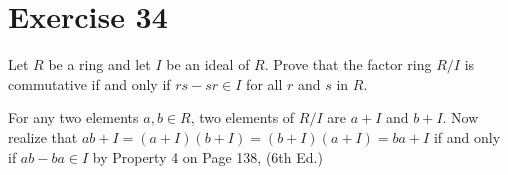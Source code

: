 \documentclass[12pt]{article}
\begin{document}
\section*{Exercise 34}

Let $R$ be a ring and let $I$ be an ideal of $R$.  Prove that the
factor ring $R/I$ is commutative if and only if $rs-sr\in I$ for all $r$ and $s$ in $R$.

For any two elements $a,b\in R$, two elements of $R/I$ are $a+I$ and $b+I$.
Now realize that $ab+I=(a+I)(b+I)=(b+I)(a+I)=ba+I$ if and only if $ab-ba\in I$
by Property 4 on Page 138, (6th Ed.)
\end{document}
